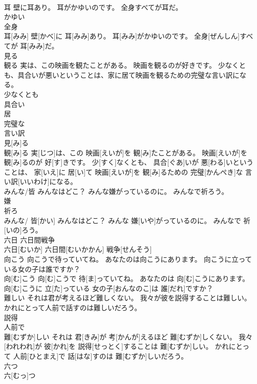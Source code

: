 \documentclass[8pt]{extreport}
\begin{document}
\begin{CJK}{UTF8}{min}
\\	耳 壁に耳あり。 耳がかゆいのです。 全身すべてが耳だ。	
\\	かゆい 
\\	全身 
\\	耳[みみ] 壁[かべ]に 耳[みみ]あり。 耳[みみ]がかゆいのです。 全身[ぜんしん]すべてが 耳[みみ]だ。
\\	見る　
\\	観る 実は、この映画を観たことがある。 映画を観るのが好きです。 少なくとも、具合いが悪いということは、家に居て映画を観るための完璧な言い訳になる。	
\\	少なくとも 
\\	具合い 
\\	居 
\\	完璧な 
\\	言い訳 
\\	見[み]る　
\\	観[み]る 実[じつ]は、この 映画[えいが]を 観[み]たことがある。 映画[えいが]を 観[み]るのが 好[す]きです。 少[すく]なくとも、 具合[ぐあ]いが 悪[わる]いということは、 家[いえ]に 居[い]て 映画[えいが]を 観[み]るための 完璧[かんぺき]な 言い訳[いいわけ]になる。
\\	みんな/皆 みんなはどこ？ みんな嫌がっているのに。 みんなで祈ろう。	
\\	嫌 
\\	祈ろ 
\\	みんな/ 皆[かい] みんなはどこ？ みんな 嫌[いや]がっているのに。 みんなで 祈[いの]ろう。
\\	六日 六日間戦争	
\\	六日[むいか] 六日間[むいかかん] 戦争[せんそう]
\\	向こう 向こうで待っていてね。 あなたのは向こうにあります。 向こうに立っている女の子は誰ですか？	
\\	向[む]こう 向[む]こうで 待[ま]っていてね。 あなたのは 向[む]こうにあります。 向[む]こうに 立[た]っている 女の子[おんなのこ]は 誰[だれ]ですか？
\\	難しい それは君が考えるほど難しくない。 我々が彼を説得することは難しい。 かれにとって人前で話すのは難しいだろう。	
\\	説得 
\\	人前で 
\\	難[むずか]しい それは 君[きみ]が 考[かんが]えるほど 難[むずか]しくない。 我々[われわれ]が 彼[かれ]を 説得[せっとく]することは 難[むずか]しい。 かれにとって 人前[ひとまえ]で 話[はな]すのは 難[むずか]しいだろう。
\\	六つ	
\\	六[むっ]つ

\end{CJK}
\end{document}
